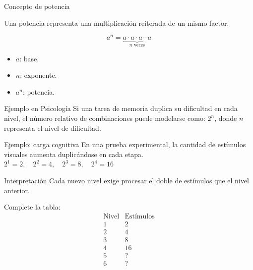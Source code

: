 \documentclass[handout,aspectratio=169]{beamer}
\begin{document}
	\begin{frame}{Concepto de potencia}
		\begin{idea}
			Una potencia representa una multiplicación reiterada de un mismo factor.
		\end{idea}
		
		\[
		a^n=
		\underbrace{a\cdot a\cdot a\cdots a}_{n\text{ veces}}
		\]
		
		\pause
		
			\begin{itemize}
				\item \(a\): base.
				\item \(n\): exponente.
				\item \(a^n\): potencia.
			\end{itemize}
	
		\pause
		
		\begin{exampleblock}{Ejemplo en Psicología}
			Si una tarea de memoria duplica su dificultad en cada nivel, el número relativo de combinaciones puede modelarse como: $2^n$, donde \(n\) representa el nivel de dificultad.
		\end{exampleblock}
	\end{frame}
	
	
	\begin{frame}{Ejemplo: carga cognitiva}
		En una prueba experimental, la cantidad de estímulos visuales aumenta duplicándose en cada etapa. $2^1=2,\quad 2^2=4,\quad 2^3=8,\quad 2^4=16$
		
		\pause
		
		\begin{block}{Interpretación}
			Cada nuevo nivel exige procesar el doble de estímulos que el nivel anterior.
		\end{block}
		
		\pause
		
		\begin{actividad}
			Complete la tabla:
			\[\begin{array}{c|c}
				\text{Nivel} & \text{Estímulos} \\
				\hline
				1 & 2 \\
				2 & 4 \\
				3 & 8 \\
				4 & 16 \\
				5 & ? \\
				6 & ?
			\end{array}
			\]
		\end{actividad}
	\end{frame}
	
\end{document}
